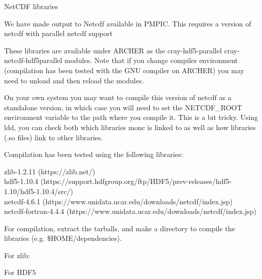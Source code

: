 \documentclass{beamer}
\newenvironment{Shaded}{}{}
\newcommand{\FunctionTok}[1]{\textcolor[rgb]{0.00,0.00,0.00}{{#1}}}
\newcommand{\VariableTok}[1]{\textcolor[rgb]{0.00,0.00,0.00}{{#1}}}
\newcommand{\ExtensionTok}[1]{{#1}}
\newcommand{\NormalTok}[1]{{#1}}
\begin{document}
\begin{frame}[fragile]{NetCDF libraries}
\protect\hypertarget{netcdf-libraries}{}

We have made output to Netcdf available in PMPIC. This requires a
version of netcdf with parallel netcdf support

These libraries are available under ARCHER as the cray-hdf5-parallel
cray-netcdf-hdf5parallel modules. Note that if you change compiler
environment (compilation has been tested with the GNU compiler on
ARCHER) you may need to unload and then reload the modules.

On your own system you may want to compile this version of netcdf as a
standalone version, in which case you will need to set the NETCDF\_ROOT
environment variable to the path where you compile it. This is a bit
tricky. Using ldd, you can check both which libraries monc is linked to
as well as how libraries (.so files) link to other libraries.

Compilation has been tested using the following libraries:

zlib-1.2.11 (https://zlib.net/)\\
hdf5-1.10.4
(https://support.hdfgroup.org/ftp/HDF5/prev-releases/hdf5-1.10/hdf5-1.10.4/src/)\\
netcdf-4.6.1 (https://www.unidata.ucar.edu/downloads/netcdf/index.jsp)\\
netcdf-fortran-4.4.4
(https://www.unidata.ucar.edu/downloads/netcdf/index.jsp)

For compilation, extract the tarballs, and make a directory to compile
the libraries (e.g. \$HOME/dependencies).

For zlib:

\begin{Shaded}
\end{Shaded}

For HDF5

\begin{Shaded}
\end{Shaded}


\end{frame}
\end{document}
